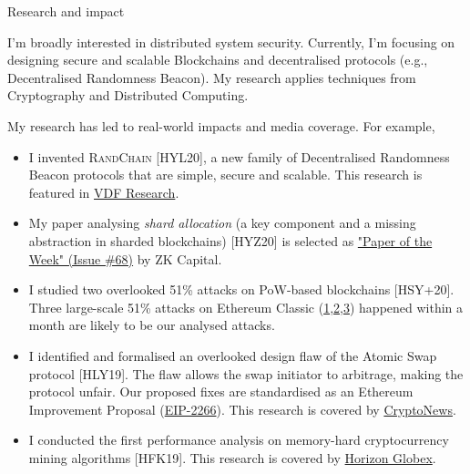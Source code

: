 \documentclass{resume} %
\begin{document}
\begin{rSection}{Research and impact}

I'm broadly interested in distributed system security.
Currently, I'm focusing on designing secure and scalable Blockchains and decentralised protocols (e.g., Decentralised Randomness Beacon).
My research applies techniques from Cryptography and Distributed Computing.

My research has led to real-world impacts and media coverage. For example,
\begin{itemize}
    \item I invented \textsc{RandChain} [HYL20], a new family of Decentralised Randomness Beacon protocols that are simple, secure and scalable. This research  is featured in \href{https://vdfresearch.org/}{VDF Research}.
    \item My paper analysing \emph{shard allocation} (a key component and a missing abstraction in sharded blockchains) [HYZ20] is selected as \href{https://zkcapital.substack.com/}{"Paper of the Week" (Issue \#68)} by ZK Capital.
    \item I studied two overlooked 51\% attacks on PoW-based blockchains [HSY+20]. Three large-scale 51\% attacks on Ethereum Classic (\href{https://news.bitcoin.com/ethereum-classic-suffers-51-attack-again-delisting-risk-amplified}{1},\href{https://decrypt.co/40196/hackers-launch-third-51-attack-on-ethereum-classic-this-month}{2},\href{https://coingeek.com/over-1m-double-spent-in-latest-ethereum-classic-51-attack}{3}) happened within a month are likely to be our analysed attacks.
    \item I identified and formalised an overlooked design flaw of the Atomic Swap protocol [HLY19]. The flaw allows the swap initiator to arbitrage, making the protocol unfair. Our proposed fixes are standardised as an Ethereum Improvement Proposal (\href{https://github.com/ethereum/EIPs/issues/2266}{EIP-2266}). This research is covered by \href{https://cryptonews.com.au/monash-university-researchers-developing-cryptocurrency-transaction-platform}{CryptoNews}.
    \item I conducted the first performance analysis on memory-hard cryptocurrency mining algorithms [HFK19]. This research is covered by \href{https://medium.com/@horizonfintex/blockchain-research-bytes-1-9d023e080765}{Horizon Globex}.
\end{itemize}

\end{rSection}
\end{document}
